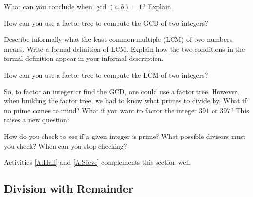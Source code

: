 \begin{question}
What can you conclude when $\gcd(a,b)=1$?  Explain. 
\end{question}
\QM

\begin{question}
How can you use a factor tree to compute the GCD of two integers?
\end{question}
\QM

\begin{question}
Describe informally what the least common multiple (LCM) 
of two numbers means.  Write a formal definition of LCM.  Explain how the two conditions in the formal 
definition appear in your informal description. 
\end{question}
\QM

\begin{question}
How can you use a factor tree to compute the LCM of two integers?
\end{question}
\QM


So, to factor an integer or find the GCD, one could use a factor
tree. However, when building the factor tree, we had to know what
primes to divide by. What if no prime comes to mind? What if you want
to factor the integer $391$ or $397$? This raises a new question:

\begin{question} 
How do you check to see if a given integer is prime? What possible
divisors must you check? When can you stop checking?
\end{question}
\QM


\begin{activitynote}
Activities \ref{A:Hall} and \ref{A:Sieve} complements this section well. %
\end{activitynote}









\subsection{Division with Remainder}


